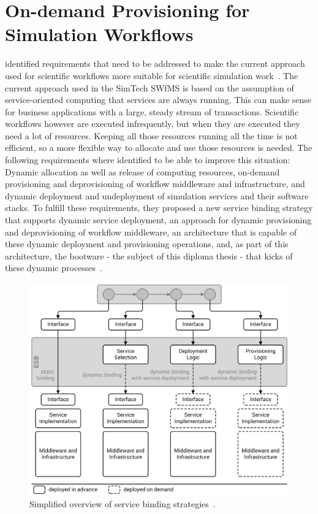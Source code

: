 \section{On-demand Provisioning for Simulation Workflows}
\label{previous:ondemand}

\citeauthor*{provisioning:ondemand} identified requirements that need to be addressed to make the current approach used for scientific workflows more suitable for scientific simulation work~\autocite{provisioning:ondemand}.
The current approach used in the SimTech SWfMS is based on the assumption of service-oriented computing that services are always running.
This can make sense for business applications with a large, steady stream of transactions.
Scientific workflows however are executed infrequently, but when they are executed they need a lot of resources.
Keeping all those resources running all the time is not efficient, so a more flexible way to allocate and use those resources is needed.
The following requirements where identified to be able to improve this situation: Dynamic allocation as well as release of computing resources, on-demand provisioning and deprovisioning of workflow middleware and infrastructure, and dynamic deployment and undeployment of simulation services and their software stacks.
To fulfill these requirements, they proposed a new service binding strategy that supports dynamic service deployment, an approach for dynamic provisioning and deprovisioning of workflow middleware, an architecture that is capable of these dynamic deployment and provisioning operations, and, as part of this architecture, the bootware - the subject of this diploma thesis - that kicks of these dynamic processes~\autocite{provisioning:ondemand}.

\begin{figure}[!htbp]
	\centering
	\includegraphics[resolution=600]{previous/assets/service_binding_strategies}
	\caption{Simplified overview of service binding strategies~\autocite[based on][]{provisioning:ondemand}.}
	\label{image:service_binding_strategies}
\end{figure}

